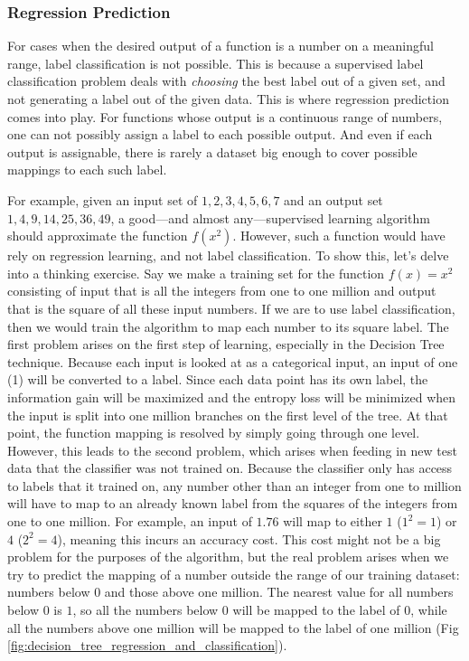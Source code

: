 \subsubsection{Regression Prediction}
\label{sec:regression_supervised_learning}
For cases when the desired output of a function is a number on a meaningful range, label classification is not possible. This is because a supervised label classification problem deals with \textit{choosing} the best label out of a given set, and not generating a label out of the given data. This is where regression prediction comes into play. For functions whose output is a continuous range of numbers, one can not possibly assign a label to each possible output. And even if each output is assignable, there is rarely a dataset big enough to cover possible mappings to each such label.

For example, given an input set of ${1,2,3,4,5,6,7}$ and an output set ${1,4,9,14,25,36,49}$, a good---and almost any---supervised learning algorithm should approximate the function $f(x^2)$. However, such a function would have rely on regression learning, and not label classification. To show this, let's delve into a thinking exercise. Say we make a training set for the function $f(x) = x^2$ consisting of input that is all the integers from one to one million and output that is the square of all these input numbers. If we are to use label classification, then we would train the algorithm to map each number to its square label. The first problem arises on the first step of learning, especially in the Decision Tree technique. Because each input is looked at as a categorical input, an input of one (1) will be converted to a label. Since each data point has its own label, the information gain will be maximized and the entropy loss will be minimized when the input is split into one million branches on the first level of the tree. At that point, the function mapping is resolved by simply going through one level. However, this leads to the second problem, which arises when feeding in new test data that the classifier was not trained on. Because the classifier only has access to labels that it trained on, any number other than an integer from one to million will have to map to an already known label from the squares of the integers from one to one million. For example, an input of $1.76$ will map to either $1$ ($1^2=1$) or $4$ ($2^2 = 4$), meaning this incurs an accuracy cost. This cost might not be a big problem for the purposes of the algorithm, but the real problem arises when we try to predict the mapping of a number outside the range of our training dataset: numbers below 0 and those above one million. The nearest value for all numbers below 0 is $1$, so all the numbers below 0 will be mapped to the label of $0$, while all the numbers above one million will be mapped to the label of one million (Fig \ref{fig:decision_tree_regression_and_classification}).

